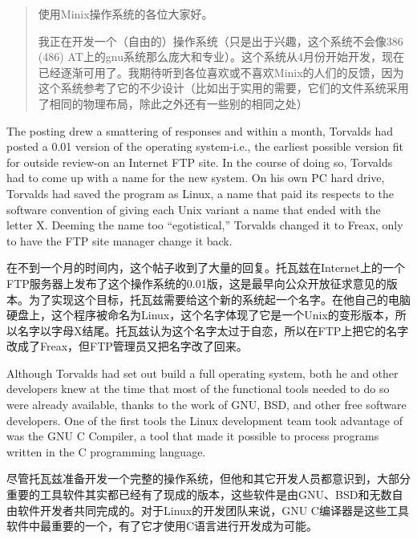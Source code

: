 \ifdefined\chs
\begin{quote}
使用Minix操作系统的各位大家好。

我正在开发一个（自由的）操作系统（只是出于兴趣，这个系统不会像386 (486) AT上的gnu系统那么庞大和专业）。这个系统从4月份开始开发，现在已经逐渐可用了。我期待听到各位喜欢或不喜欢Minix的人们的反馈，因为这个系统参考了它的不少设计（比如出于实用的需要，它们的文件系统采用了相同的物理布局，除此之外还有一些别的相同之处）
\end{quote}
\fi

\ifdefined\eng
The posting drew a smattering of responses and within a month, Torvalds had posted a 0.01 version of the operating system-i.e., the earliest possible version fit for outside review-on an Internet FTP site. In the course of doing so, Torvalds had to come up with a name for the new system. On his own PC hard drive, Torvalds had saved the program as Linux, a name that paid its respects to the software convention of giving each Unix variant a name that ended with the letter X. Deeming the name too ``egotistical,'' Torvalds changed it to Freax, only to have the FTP site manager change it back.
\fi

\ifdefined\chs
在不到一个月的时间内，这个帖子收到了大量的回复。托瓦兹在Internet上的一个FTP服务器上发布了这个操作系统的0.01版，这是最早向公众开放征求意见的版本。为了实现这个目标，托瓦兹需要给这个新的系统起一个名字。在他自己的电脑硬盘上，这个程序被命名为Linux，这个名字体现了它是一个Unix的变形版本，所以名字以字母X结尾。托瓦兹认为这个名字太过于自恋，所以在FTP上把它的名字改成了Freax，但FTP管理员又把名字改了回来。
\fi

\ifdefined\eng
Although Torvalds had set out build a full operating system, both he and other developers knew at the time that most of the functional tools needed to do so were already available, thanks to the work of GNU, BSD, and other free software developers. One of the first tools the Linux development team took advantage of was the GNU C Compiler, a tool that made it possible to process programs written in the C programming language.
\fi

\ifdefined\chs
尽管托瓦兹准备开发一个完整的操作系统，但他和其它开发人员都意识到，大部分重要的工具软件其实都已经有了现成的版本，这些软件是由GNU、BSD和无数自由软件开发者共同完成的。对于Linux的开发团队来说，GNU C编译器是这些工具软件中最重要的一个，有了它才使用C语言进行开发成为可能。
\fi

